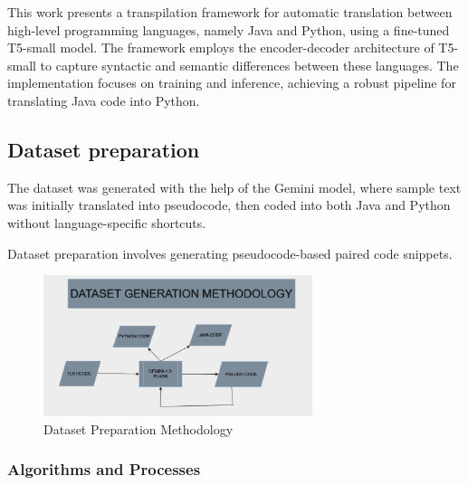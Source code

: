 \documentclass{dhbenelux}
\begin{document}
This work presents a transpilation framework for automatic translation between high-level programming languages, namely Java and Python, using a fine-tuned T5-small model. The framework employs the encoder-decoder architecture of T5-small to capture syntactic and semantic differences between these languages. The implementation focuses on training and inference, achieving a robust pipeline for translating Java code into Python.

\subsection{Dataset preparation}
    The dataset was generated with the help of the Gemini model, where sample text was initially translated into pseudocode, then coded into both Java and Python without language-specific shortcuts.
\begin{enumerate}
    Dataset preparation involves generating pseudocode-based paired code snippets. 
    \begin{figure}[h!]
\centering
\includegraphics[width=0.7\textwidth]{dataset_methodology.png} %
\caption{Dataset Preparation Methodology}
\end{figure}
\end{enumerate}
\subsubsection{Algorithms and Processes}
\end{document}
